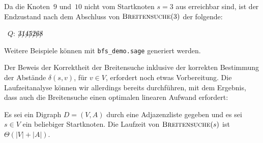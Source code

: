 \begin{bsp}
Da die Knoten~$9$ und~$10$ nicht vom Startknoten $s=3$ aus erreichbar sind, ist der Endzustand nach dem Abschluss von $\mathop{\text{\textsc{Breitensuche}}}(3)$ der folgende:

\condclearpage 
{}
\hfill\, $Q: \ \not 3 \not1 \not4 \not5 \not2 \not6 \not8$

Weitere Beispiele können mit \verb#bfs_demo.sage# generiert werden.
\end{bsp}

\begin{bem}
Der Beweis der Korrektheit der Breitensuche inklusive der korrekten Bestimmung der Abstände $\delta(s,v)$, für $v \in V$, erfordert noch etwas Vorbereitung.
Die Laufzeitanalyse können wir allerdings bereits durchführen, mit dem Ergebnis, dass auch die Breitensuche einen optimalen linearen Aufwand erfordert:
\end{bem}

\begin{thm}
\label{thm:laufzeit-breitensuche}
Es sei ein Digraph $D=(V,A)$ durch eine Adjazenzliste gegeben und es sei $s \in V$ ein beliebiger Startknoten.
Die Laufzeit von $\mathop{\text{\textsc{Breitensuche}}}(s)$ ist $\Theta(|V|+|A|)$.
\end{thm}


